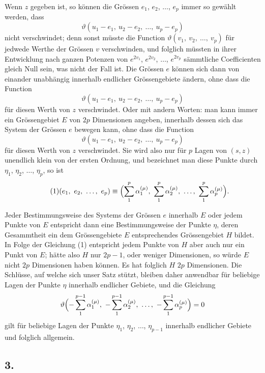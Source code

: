\documentclass[12pt,a4paper]{book}
\theoremstyle{definition}
\theoremstyle{remark}
\begin{document}
Wenn $z$ gegeben ist, so können die Grössen $e_1$, $e_2$, $\ldots$, $e_p$ immer so gewählt werden, dass
\[ \vartheta(u_1-e_1,\ u_2-e_2,\ \ldots,\ u_p-e_p) \]
nicht verschwindet; denn sonst müsste die Function $\vartheta(v_1,\ v_2,\ \ldots,\ v_p)$ für jedwede Werthe der Grössen $v$ verschwinden, und folglich müssten in ihrer Entwicklung nach ganzen Potenzen von $e^{2v_1}$, $e^{2v_2}$, $\ldots$, $e^{2v_p}$ sämmtliche Coefficienten gleich Null sein, was nicht der Fall ist. Die Grössen $e$ können sich dann von einander unabhängig innerhalb endlicher Grössengebiete ändern, ohne dass die Function
\[ \vartheta(u_1-e_1,\ u_2-e_2,\ \ldots,\ u_p-e_p) \]
für diesen Werth von $z$ verschwindet. Oder mit andern Worten: man kann immer ein Grössengebiet $E$ von $2p$ Dimensionen angeben, innerhalb dessen sich das System der Grössen $e$ bewegen kann, ohne dass die Function
\[ \vartheta(u_1-e_1,\ u_2-e_2,\ \ldots,\ u_p-e_p) \]
für diesen Werth von $z$ verschwindet. Sie wird also nur für $p$ Lagen von $(s, z)$ unendlich klein von der ersten Ordnung, und bezeichnet man diese Punkte durch $\eta_1$, $\eta_2$, $\ldots$, $\eta_p$, so ist
\begin{equation}
\tag{1} (e_1,\ e_2,\ \ldots,\ e_p) \equiv \Bigl(\sum_1^p \alpha_1^{(\mu)},\ \sum_1^p \alpha_2^{(\mu)},\ \ldots,\ \sum_1^p \alpha_p^{(\mu)}\Bigr). \end{equation}

Jeder Bestimmungsweise des Systems der Grössen $e$ innerhalb $E$ oder jedem Punkte von $E$ entspricht dann eine Bestimmungsweise der Punkte $\eta$, deren Gesammtheit ein dem Grössengebiete $E$ entsprechendes Grössengebiet $H$ bildet. In Folge der Gleichung (1) entspricht jedem Punkte von $H$ aber auch nur ein Punkt von $E$; hätte also $H$ nur $2p-1$, oder weniger Dimensionen, so würde $E$ nicht $2p$ Dimensionen haben können. Es hat folglich $H$ $2p$ Dimensionen. Die Schlüsse, auf welche sich unser Satz stützt, bleiben daher anwendbar für beliebige Lagen der Punkte $\eta$ innerhalb endlicher Gebiete, und die Gleichung
\[ \vartheta\Bigl(-\sum_1^{p-1} \alpha_1^{(\mu)},\ -\sum_1^{p-1} \alpha_2^{(\mu)},\ \ldots,\ -\sum_1^{p-1} \alpha_p^{(\mu)}\Bigr) = 0 \]
gilt für beliebige Lagen der Punkte $\eta_1$, $\eta_2$, $\ldots$, $\eta_{p-1}$ innerhalb endlicher Gebiete und folglich allgemein.

\subsection*{3.}
\end{document}
